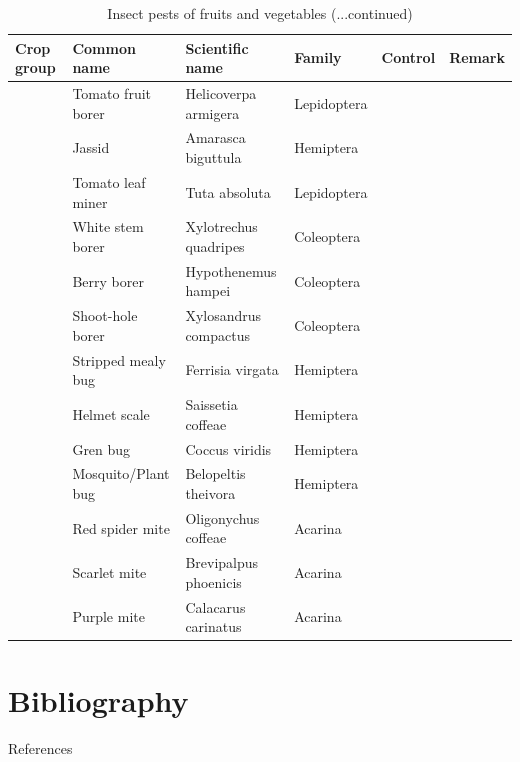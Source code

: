 \documentclass[10pt,dvipsnames,ignorenonframetext,aspectratio=169]{beamer}
\newif\ifbibliography
\begin{document}
\begin{frame}{}
\protect\hypertarget{section-27}{}
\begin{table}

\caption{\label{tab:unnamed-chunk-9}Insect pests of fruits and vegetables (...continued)}
\centering
\fontsize{5}{7}\selectfont
\begin{tabular}[t]{>{\raggedright\arraybackslash}p{6em}>{\raggedright\arraybackslash}p{10em}>{\raggedright\arraybackslash}p{14em}>{\raggedright\arraybackslash}p{12em}>{\raggedright\arraybackslash}p{8em}>{\raggedright\arraybackslash}p{8em}}
\toprule
Crop group & Common name & Scientific name & Family & Control & Remark\\
\midrule
 & Tomato fruit borer & Helicoverpa armigera & Lepidoptera &  & \\
\cmidrule{2-6}
 & Jassid & Amarasca biguttula & Hemiptera &  & \\
\cmidrule{2-6}
\multirow{-3}{6em}{\raggedright\arraybackslash Tomato} & Tomato leaf miner & Tuta absoluta & Lepidoptera &  & \\
\cmidrule{1-6}
 & White stem borer & Xylotrechus quadripes & Coleoptera &  & \\
\cmidrule{2-6}
 & Berry borer & Hypothenemus hampei & Coleoptera &  & \\
\cmidrule{2-6}
 & Shoot-hole borer & Xylosandrus compactus & Coleoptera &  & \\
\cmidrule{2-6}
 & Stripped mealy bug & Ferrisia virgata & Hemiptera &  & \\
\cmidrule{2-6}
 & Helmet scale & Saissetia coffeae & Hemiptera &  & \\
\cmidrule{2-6}
\multirow{-6}{6em}{\raggedright\arraybackslash Coffee} & Gren bug & Coccus viridis & Hemiptera &  & \\
\cmidrule{1-6}
 & Mosquito/Plant bug & Belopeltis theivora & Hemiptera &  & \\
\cmidrule{2-6}
 & Red spider mite & Oligonychus coffeae & Acarina &  & \\
\cmidrule{2-6}
 & Scarlet mite & Brevipalpus phoenicis & Acarina &  & \\
\cmidrule{2-6}
\multirow{-4}{6em}{\raggedright\arraybackslash Tea} & Purple mite & Calacarus carinatus & Acarina &  & \\
\bottomrule
\end{tabular}
\end{table}
\end{frame}

\hypertarget{bibliography}{%
\section{Bibliography}\label{bibliography}}

\begin{frame}{References}
\protect\hypertarget{references}{}
\end{frame}

          \begin{frame}[allowframebreaks]{}
    \bibliographytrue
    
    \end{frame}
  
\end{document}
